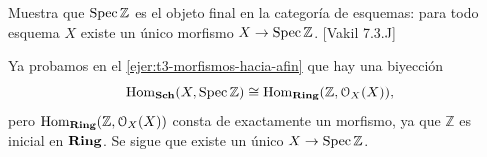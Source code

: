 \begin{ejer}\label{ejer:t3-objeto-final}
Muestra que $\operatorname{Spec}\mathbb Z$ es el objeto final en la categoría de esquemas: para todo esquema $X$ existe un único morfismo $X\to\operatorname{Spec}\mathbb Z$. \hfill [Vakil 7.3.J]
\end{ejer}
\begin{sol}
Ya probamos en el \cref{ejer:t3-morfismos-hacia-afin} que hay una biyección
\[
\operatorname{Hom}_{\mathbf{Sch}}(X,\operatorname{Spec}\mathbb Z)
\cong\operatorname{Hom}_{\mathbf{Ring}}(\mathbb Z,\mathcal O_X(X)),
\]
pero $\operatorname{Hom}_{\mathbf{Ring}}(\mathbb Z,\mathcal O_X(X))$ consta de exactamente un morfismo, ya que $\mathbb Z$ es inicial en $\mathbf{Ring}$. Se sigue que existe un único $X\to\operatorname{Spec}\mathbb Z$.
\end{sol}
